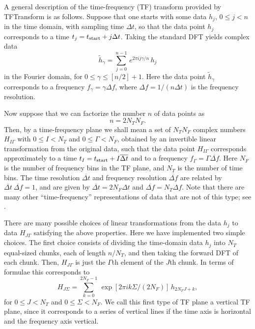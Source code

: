 \documentclass{article}
\begin{document}
A general description of the time-frequency (TF) transform provided by
TFTransform is as follows.  Suppose that one starts with some data
$h_j$, $0 \le j < n$ in the time domain, with sampling time $\Delta
t$, so that the data point $h_j$ corresponds to a time $t_j = t_{\rm
start} + j \Delta t$.  Taking the standard DFT yields complex data
\begin{equation}
{\tilde h}_\gamma = \sum_{j=0}^{n-1} \, e^{2 \pi i j \gamma / n} \, h_j
\label{standarddft}
\end{equation}
in the Fourier domain, for $0 \le \gamma \le [n/2]+1$.
Here the data point ${\tilde h}_\gamma$ corresponds to a frequency
$f_\gamma = \gamma \Delta f$, where $\Delta f= 1/(n \Delta t)$ is the
frequency resolution.  


Now suppose that we can factorize the number $n$ of data points as
\begin{equation}
n = 2 N_T N_F.
\end{equation}
Then, by a time-frequency plane we shall mean a set of $N_T N_F$
complex numbers $H_{I\Gamma}$ with $0 \le I < N_T$ and $0 \le \Gamma <
N_F$, obtained by an invertible linear transformation from the
original data, such  
that the data point $H_{I\Gamma}$ corresponds approximately to a time
$t_I = t_{\rm start} + I {\overline {\Delta t}}$ and to a frequency 
$f_\Gamma = \Gamma {\overline {\Delta f}}$.  Here $N_F$ is the number
of frequency bins in the TF plane, and $N_T$ is the number of time
bins.  The time resolution ${\overline {\Delta t}}$ and frequency
resolution ${\overline {\Delta f}}$ are related by 
${\overline {\Delta t}} \ {\overline {\Delta f}} =1$, and are given by
${\overline {\Delta t}} = 2 N_F \Delta t$ and 
${\overline {\Delta f}} = N_T \Delta f$.  Note that there are many
other ``time-frequency'' representations of data that are not of this
type; see \cite{ab:1999}.


There are many possible choices of linear transformations from the
data $h_j$ to data $H_{J\Gamma}$ satisfying the above properties.
Here we have implemented two simple choices.  The first choice consists of
dividing the time-domain data $h_j$ into $N_T$ equal-sized chunks,
each of length $n/N_T$, and then taking the forward DFT of each chunk.
Then, 
$H_{J\Gamma}$ is just the $\Gamma$th element of the $J$th chunk.
In terms of formulae this corresponds to
\begin{equation}
H_{J\Sigma} = \sum_{k=0}^{2 N_F-1} \, \exp \left[ 2 \pi i k \Sigma / (2
N_F) \right] \, h_{2 N_F J + k},
\label{verticalTFP}
\end{equation}
for $0 \le J < N_T$ and $0 \le \Sigma < N_F$.  We call this first type
of TF plane a vertical TF plane, since it corresponds to a series of
vertical lines if the time axis is horizontal and the frequency axis
vertical. 
\end{document}
